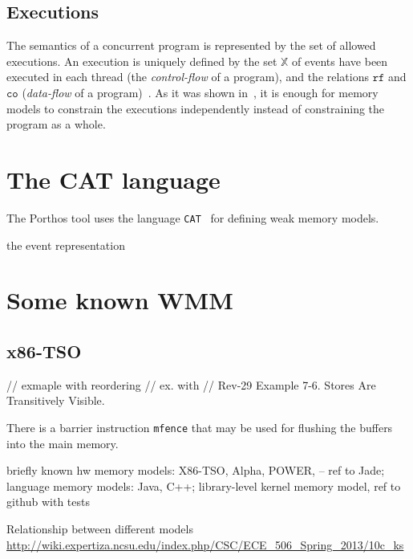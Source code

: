 \subsection{Executions}
\label{ch:wmm:model:executions}

The semantics of a concurrent program is represented by the set of allowed executions.
An execution is uniquely defined by the set $\mathbb{X}$ of events have been executed in each thread (the \textit{control-flow} of a program), and the relations $\mathtt{rf}$ and $\mathtt{co}$ (\textit{data-flow} of a program)~\cite{alglave2010shared}. As it was shown in~\cite{wickerson2017automatically}, it is enough for memory models to constrain the executions independently instead of constraining the program as a whole.

\section{The CAT language}

The Porthos tool uses the language \texttt{CAT}~\cite{alglave2016syntax} for defining weak memory models.

the event representation

\section{Some known WMM}

\subsection{x86-TSO}
\label{ch:wmm:x86}
// exmaple with reordering
// ex. with 
// Rev-29 Example 7-6. Stores Are Transitively Visible. %

There is a barrier instruction \texttt{mfence} that may be used for flushing the buffers into the main memory.

briefly known hw memory models: X86-TSO, Alpha, POWER, -- ref to Jade;
language memory models: Java, C++;
library-level kernel memory model, ref to github with tests

Relationship between different models \url{http://wiki.expertiza.ncsu.edu/index.php/CSC/ECE_506_Spring_2013/10c_ks}
